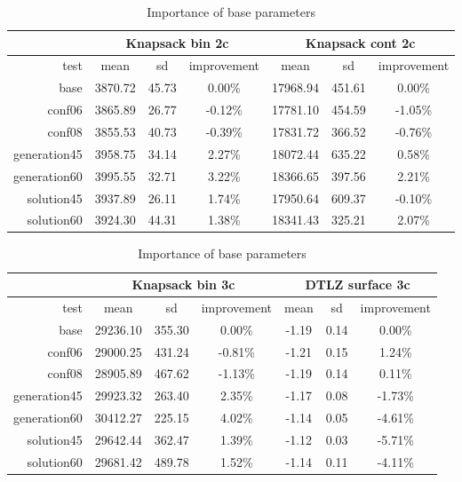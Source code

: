 \begin{table}
  \centering
  \caption{Importance of base parameters}
  \label{t:base_imp_1}
  \begin{tabular}{r c c c c c c}
    & \multicolumn{3}{c}{Knapsack bin 2c} & \multicolumn{3}{c}{Knapsack cont 2c} \\
    \hline
    test & mean & sd & improvement & mean & sd & improvement \\
    \hline
    \hline
    base & 3870.72 & 45.73 & 0.00\% & 17968.94 & 451.61 & 0.00\% \\
    conf06 & 3865.89 & 26.77 & -0.12\% & 17781.10 & 454.59 & -1.05\% \\
    conf08 & 3855.53 & 40.73 & -0.39\% & 17831.72 & 366.52 & -0.76\% \\
    generation45 & 3958.75 & 34.14 & 2.27\% & 18072.44 & 635.22 & 0.58\% \\
    generation60 & 3995.55 & 32.71 & 3.22\% & 18366.65 & 397.56 & 2.21\% \\
    solution45 & 3937.89 & 26.11 & 1.74\% & 17950.64 & 609.37 & -0.10\% \\
    solution60 & 3924.30 & 44.31 & 1.38\% & 18341.43 & 325.21 & 2.07\% \\

    \hline
  \end{tabular}
\end{table}

\begin{table}
  \centering
  \caption{Importance of base parameters}
  \label{t:base_imp_2}
  \begin{tabular}{r c c c c c c}
    & \multicolumn{3}{c}{Knapsack bin 3c} & \multicolumn{3}{c}{DTLZ surface 3c} \\
    \hline
    test & mean & sd & improvement & mean & sd & improvement \\
    \hline
    \hline
    base & 29236.10 & 355.30 & 0.00\% & -1.19 & 0.14 & 0.00\% \\
    conf06 & 29000.25 & 431.24 & -0.81\% & -1.21 & 0.15 & 1.24\% \\
    conf08 & 28905.89 & 467.62 & -1.13\% & -1.19 & 0.14 & 0.11\% \\
    generation45 & 29923.32 & 263.40 & 2.35\% & -1.17 & 0.08 & -1.73\% \\
    generation60 & 30412.27 & 225.15 & 4.02\% & -1.14 & 0.05 & -4.61\% \\
    solution45 & 29642.44 & 362.47 & 1.39\% & -1.12 & 0.03 & -5.71\% \\
    solution60 & 29681.42 & 489.78 & 1.52\% & -1.14 & 0.11 & -4.11\% \\
    \hline
  \end{tabular}
\end{table}


